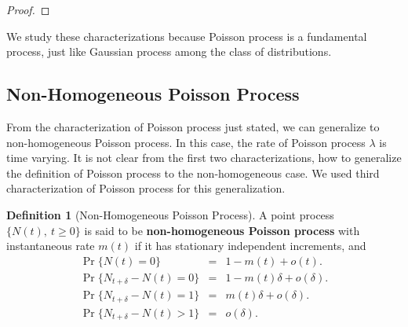 \documentclass[a4paper,10pt]{article}
\theoremstyle{plain}
\theoremstyle{definition}
\newtheorem{defn}[thm]{Definition}
\begin{document}
\begin{proof}
\end{proof}

We study these characterizations because Poisson process is a fundamental process, just like Gaussian process among the class of distributions.

\subsection{Non-Homogeneous Poisson Process}
From the characterization of Poisson process just stated, we can generalize to non-homogeneous Poisson process. In this case, the rate of Poisson process $\lambda$ is time varying. It is not clear from the first two characterizations, how to generalize the definition of Poisson process to the non-homogeneous case. We used third characterization of Poisson process for this generalization. 

\begin{defn}[Non-Homogeneous Poisson Process]\label{defn:NonHomogeneousPoisson} A point process $\{N(t),~t\geqslant 0\}$ is said to be \textbf{non-homogeneous Poisson process} with instantaneous rate $m(t)$ if it has stationary independent increments, and 
 \begin{eqnarray*}\label{eq:NonHomogeneousPoisson}
 \Pr\{N(t)=0\}&=&1-m(t)+o(t). \\
  \Pr\{N_{t+\delta}-N(t)=0\} &=& 1-m(t)\delta+o(\delta). \\
   \Pr\{N_{t+\delta}-N(t)=1\} &=& m(t)\delta+o(\delta). \\
   \Pr\{N_{t+\delta}-N(t)>1\} &=& o(\delta). \\
   \end{eqnarray*}
\end{defn}
\end{document}

